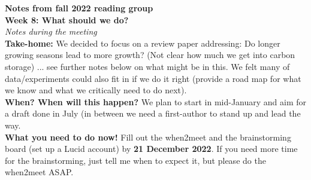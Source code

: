 \documentclass[11pt,letter]{article}
\begin{document}

\renewcommand{\refname}{\CHead{}}

{\bf \large Notes from fall 2022 reading group}\\


{\bf Week 8: What should we do?}\\

\emph{Notes during the meeting}\\

{\bf Take-home:} We decided to focus on a review paper addressing: Do longer growing seasons lead to more growth? (Not clear how much we get into carbon storage) ... see further notes below on what might be in this. We felt many of data/experiments could also fit in if we do it right (provide a road map for what we know and what we critically need to do next).\\

{\bf When? When will this happen?} We plan to start in mid-January and aim for a draft done in July (in between we need a first-author to stand up and lead the way. \\

{\bf What you need to do now!} Fill out the when2meet and the brainstorming board (set up a Lucid account) by {\bf 21 December 2022}. If you need more time for the brainstorming, just tell me when to expect it, but please do the when2meet ASAP. \\
\end{document}
